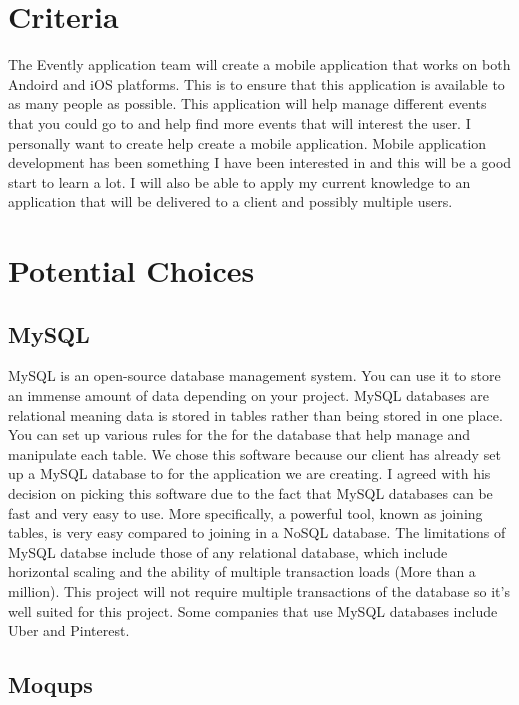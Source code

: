 \documentclass[letterpaper, 10pt,titlepage]{article}
\begin{document}

\section{Criteria}

The Evently application team will create a mobile application that works on both Andoird and iOS platforms. This is to ensure that this application is available to as many people as possible. This application will help manage different events that you could go to and help find more events that will interest the user. I personally want to create help create a mobile application. Mobile application development has been something I have been interested in and this will be a good start to learn a lot. I will also be able to apply my current knowledge to an application that will be delivered to a client and possibly multiple users. 

\section{Potential Choices}

\subsection{MySQL}

MySQL is an open-source database management system. You can use it to store an immense amount of data depending on your project. MySQL databases are relational meaning data is stored in tables rather than being stored in one place. You can set up various rules for the for the database that help manage and manipulate each table. We chose this software because our client has already set up a MySQL database to for the application we are creating. I agreed with his decision on picking this software due to the fact that MySQL databases can be fast and very easy to use. More specifically, a powerful tool, known as joining tables, is very easy compared to joining in a NoSQL database. The limitations of MySQL databse include those of any relational database, which include horizontal scaling and the ability of multiple transaction loads (More than a million). This project will not require multiple transactions of the database so it's well suited for this project. Some companies that use MySQL databases include Uber and Pinterest. 

\subsection{Moqups}
\end{document}
